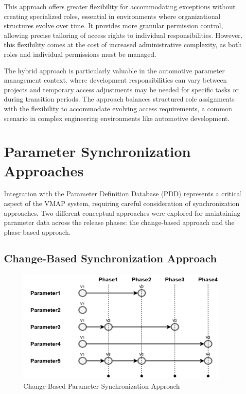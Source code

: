 This approach offers greater flexibility for accommodating exceptions without creating specialized roles, essential in environments where organizational structures evolve over time. It provides more granular permission control, allowing precise tailoring of access rights to individual responsibilities. However, this flexibility comes at the cost of increased administrative complexity, as both roles and individual permissions must be managed.

The hybrid approach is particularly valuable in the automotive parameter management context, where development responsibilities can vary between projects and temporary access adjustments may be needed for specific tasks or during transition periods. The approach balances structured role assignments with the flexibility to accommodate evolving access requirements, a common scenario in complex engineering environments like automotive development.

\section{Parameter Synchronization Approaches}
\label{sec:parameter-sync-approaches}

Integration with the Parameter Definition Database (PDD) represents a critical aspect of the VMAP system, requiring careful consideration of synchronization approaches. Two different conceptual approaches were explored for maintaining parameter data across the release phases: the change-based approach and the phase-based approach.

\subsection{Change-Based Synchronization Approach}
\label{subsec:change-based-sync}

\begin{figure}[h]
    \centering
    \includegraphics[width=0.95\textwidth]{figures/change_based_approach.png}
    \caption{Change-Based Parameter Synchronization Approach}
    \label{fig:change-based-sync}
\end{figure}


